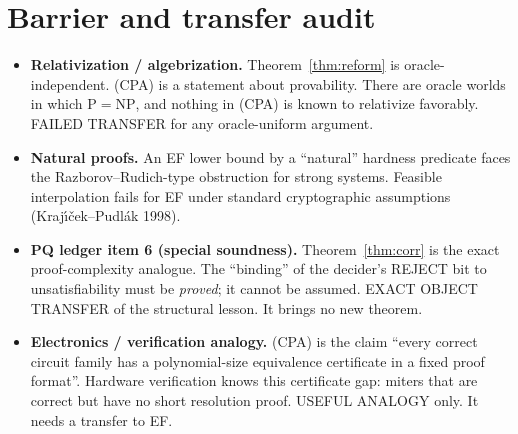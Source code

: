 \documentclass[11pt]{article}
\theoremstyle{definition}
\begin{document}
\section{Barrier and transfer audit}
\begin{itemize}
\item \textbf{Relativization / algebrization.} Theorem~\ref{thm:reform} is
oracle-independent. (CPA) is a statement about provability. There are oracle worlds in
which $\mathrm{P}=\mathrm{NP}$, and nothing in (CPA) is known to relativize favorably.
FAILED TRANSFER for any oracle-uniform argument.
\item \textbf{Natural proofs.} An EF lower bound by a ``natural'' hardness predicate
faces the Razborov--Rudich-type obstruction for strong systems. Feasible interpolation
fails for EF under standard cryptographic assumptions (Kraj\'{\i}\v{c}ek--Pudl\'ak 1998).
\item \textbf{PQ ledger item 6 (special soundness).} Theorem~\ref{thm:corr} is the exact
proof-complexity analogue. The ``binding'' of the decider's REJECT bit to unsatisfiability
must be \emph{proved}; it cannot be assumed. EXACT OBJECT TRANSFER of the structural
lesson. It brings no new theorem.
\item \textbf{Electronics / verification analogy.} (CPA) is the claim ``every correct
circuit family has a polynomial-size equivalence certificate in a fixed proof format''.
Hardware verification knows this certificate gap: miters that are correct but have no
short resolution proof. USEFUL ANALOGY only. It needs a transfer to EF.
\end{itemize}
\end{document}
